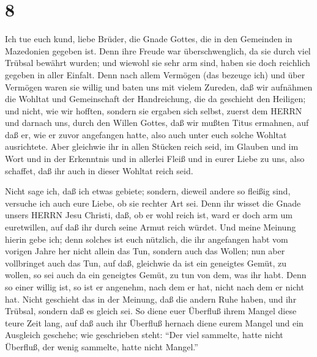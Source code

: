 \hypertarget{section-7}{%
\section{8}\label{section-7}}

 Ich tue euch kund, liebe Brüder, die Gnade Gottes, die in
den Gemeinden in Mazedonien gegeben ist.  Denn ihre Freude
war überschwenglich, da sie durch viel Trübsal bewährt wurden; und
wiewohl sie sehr arm sind, haben sie doch reichlich gegeben in aller
Einfalt.  Denn nach allem Vermögen (das bezeuge ich) und
über Vermögen waren sie willig  und baten uns mit vielem
Zureden, daß wir aufnähmen die Wohltat und Gemeinschaft der
Handreichung, die da geschieht den Heiligen;  und nicht, wie
wir hofften, sondern sie ergaben sich selbst, zuerst dem HERRN und
darnach uns, durch den Willen Gottes,  daß wir mußten Titus
ermahnen, auf daß er, wie er zuvor angefangen hatte, also auch unter
euch solche Wohltat ausrichtete.  Aber gleichwie ihr in
allen Stücken reich seid, im Glauben und im Wort und in der Erkenntnis
und in allerlei Fleiß und in eurer Liebe zu uns, also schaffet, daß ihr
auch in dieser Wohltat reich seid.

 Nicht sage ich, daß ich etwas gebiete; sondern, dieweil
andere so fleißig sind, versuche ich auch eure Liebe, ob sie rechter Art
sei.  Denn ihr wisset die Gnade unsers HERRN Jesu Christi,
daß, ob er wohl reich ist, ward er doch arm um euretwillen, auf daß ihr
durch seine Armut reich würdet.  Und meine Meinung hierin
gebe ich; denn solches ist euch nützlich, die ihr angefangen habt vom
vorigen Jahre her nicht allein das Tun, sondern auch das Wollen;
 nun aber vollbringet auch das Tun, auf daß, gleichwie da
ist ein geneigtes Gemüt, zu wollen, so sei auch da ein geneigtes Gemüt,
zu tun von dem, was ihr habt.  Denn so einer willig ist, so
ist er angenehm, nach dem er hat, nicht nach dem er nicht hat.
 Nicht geschieht das in der Meinung, daß die andern Ruhe
haben, und ihr Trübsal, sondern daß es gleich sei.  So
diene euer Überfluß ihrem Mangel diese teure Zeit lang, auf daß auch ihr
Überfluß hernach diene eurem Mangel und ein Ausgleich geschehe;
 wie geschrieben steht: ``Der viel sammelte, hatte nicht
Überfluß, der wenig sammelte, hatte nicht Mangel.''

